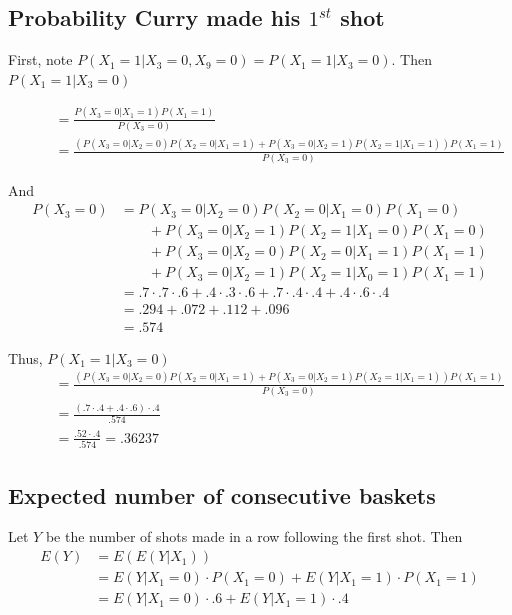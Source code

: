 \documentclass[paper=a4, fontsize=11pt]{scrartcl} %
\numberwithin{equation}{section} %
\numberwithin{figure}{section} %
\numberwithin{table}{section} %
\begin{document}
\subsection{Probability Curry made his $1^{st}$ shot}

First, note $P(X_1 = 1 | X_3 = 0, X_9 = 0) = P(X_1 = 1 | X_3 = 0)$. Then $P(X_1 = 1 | X_3 = 0)$

\begin{align*}
   &\qquad {}= \frac{P(X_3 = 0 | X_1 = 1) P(X_1 = 1)}{P(X_3 = 0)} \\
   &\qquad {}= \frac{\left(P(X_3 = 0 | X_2 = 0) P(X_2 = 0 | X_1 = 1) + P(X_3 = 0 | X_2 = 1) P(X_2 = 1 | X_1 = 1) \right) P(X_1 = 1)}{P(X_3 = 0)}
\end{align*}

And
\begin{align*}
P(X_3 = 0) &= P(X_3 = 0 | X_2 = 0) P(X_2 = 0 | X_1 = 0)P(X_1 = 0) 
   \\& \qquad {} + P(X_3 = 0 | X_2 = 1) P(X_2 = 1 | X_1 = 0)P(X_1 = 0) 
   \\& \qquad {} + P(X_3 = 0 | X_2 = 0) P(X_2 = 0 | X_1 = 1)P(X_1 = 1)
   \\& \qquad {} + P(X_3 = 0 | X_2 = 1) P(X_2 = 1 | X_0 = 1)P(X_1 = 1) \\
   &= .7 \cdot .7 \cdot .6 + .4 \cdot .3 \cdot .6 + .7 \cdot .4 \cdot .4 + .4 \cdot .6 \cdot .4\\
   &= .294 + .072 + .112 + .096\\
   &= .574
\end{align*}

Thus, $P(X_1 = 1 | X_3 = 0)$
\begin{align*}
&\qquad {}=  \frac{\left(P(X_3 = 0 | X_2 = 0) P(X_2 = 0 | X_1 = 1) + P(X_3 = 0 | X_2 = 1) P(X_2 = 1 | X_1 = 1) \right) P(X_1 = 1)}{P(X_3 = 0)} \\
   &\qquad {}=  \frac{\left(.7 \cdot .4 + .4 \cdot .6 \right) \cdot .4 }{.574} \\
   &\qquad {}=  \frac{.52 \cdot .4 }{.574} = .36237
\end{align*}

\subsection{Expected number of consecutive baskets}

Let $Y$ be the number of shots made in a row following the first shot. Then
\begin{align*}
E(Y) &= E(E(Y | X_1))\\
   &= E(Y | X_1 = 0) \cdot P(X_1 = 0) + E(Y | X_1 = 1) \cdot P(X_1 = 1)\\
   &= E(Y | X_1 = 0) \cdot .6 + E(Y | X_1 = 1) \cdot .4
\end{align*}
\end{document}
